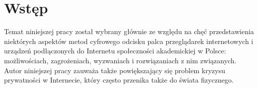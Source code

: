 \chapter*{Wstęp}


Temat niniejszej pracy został wybrany głównie ze względu na chęć przedstawienia
niektórych aspektów metod cyfrowego odcisku palca przeglądarek internetowych i
urządzeń podłączonych do Internetu społeczności akademickiej w Polsce:
możliwościach, zagrożeniach, wyzwaniach i rozwiązaniach z nim związanych. Autor
niniejszej pracy zauważa także powiększający się problem kryzysu prywatności w
Internecie, który często przenika także do świata fizycznego.

